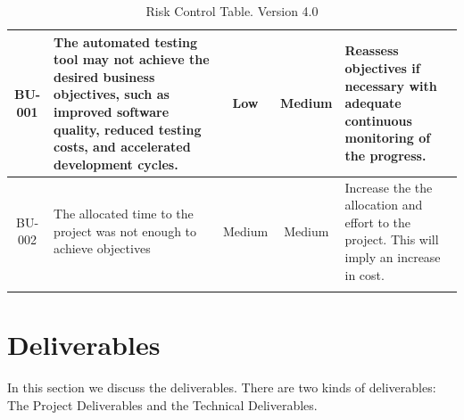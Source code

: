 \documentclass[a4paper, 11pt]{report}
\begin{document}
\begin{xltabular}{1.0\textwidth}{|c|X|c|c|X|}
    \hline \hline
    BU-001 & The automated testing tool may not achieve the desired business objectives, such as improved software quality, reduced testing costs, and accelerated development cycles. & Low & Medium &  Reassess objectives if necessary with adequate continuous monitoring of the progress.\\
    \hline
    BU-002 & The allocated time to the project was not enough to achieve objectives & Medium & Medium &  Increase the the allocation and effort to the project. This will imply an increase in cost. \\
    \hline
    \caption{Risk Control Table. Version 4.0}
    \label{table:Risks}
\end{xltabular}


\section{Deliverables}
In this section we discuss the deliverables. There are two kinds of deliverables: The Project Deliverables and the Technical Deliverables.
\end{document}
